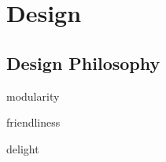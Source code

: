 \chapter{Design}

\section{Design Philosophy}\label{design-philosophy}

modularity

friendliness

delight
